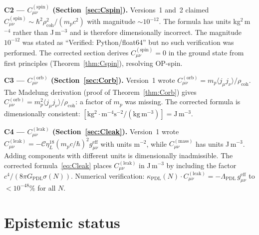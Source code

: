 \documentclass[12pt,a4paper]{article}
\newcommand{\hb}{\hbar}
\newcommand{\Cmass}{C^{(\mathrm{mass})}}
\newcommand{\Cspin}{C^{(\mathrm{spin})}}
\newcommand{\Corb}{C^{(\mathrm{orb})}}
\newcommand{\Cleak}{C^{(\mathrm{leak})}}
\newcommand{\rhocoh}{\rho_{\mathrm{coh}}}
\newcommand{\sig}{\sigma}
\newcommand{\kPDL}{\kappa_{\mathrm{PDL}}}
\newcommand{\GPDL}{G_{\mathrm{PDL}}}
\newcommand{\geff}{g_{\mu\nu}^{\mathrm{eff}}}
\newcommand{\etaL}{\eta_L}
\newcommand{\LambdaPDL}{\Lambda_{\mathrm{PDL}}}
\begin{document}
\textbf{C2 --- $\Cspin_{\mu\nu}$ (Section~\ref{sec:Cspin}).} Versions~1 and~2 claimed $\Cspin_{\mu\nu} \sim \hb^2\rhocoh^2/(m_p c^2)$ with magnitude $\sim 10^{-12}$. The formula has units kg$^2$\,m$^{-4}$ rather than J\,m$^{-3}$ and is therefore dimensionally incorrect. The magnitude $10^{-12}$ was stated as ``Verified: Python/float64'' but no such verification was performed. The corrected section derives $\Cspin_{\mu\nu} = 0$ in the ground state from first principles (Theorem~\ref{thm:Cspin}), resolving OP-spin.

\textbf{C3 --- $\Corb_{\mu\nu}$ (Section~\ref{sec:Corb}).} Version~1 wrote $\Corb_{\mu\nu} = m_p\langle j_\mu j_\nu\rangle/\rhocoh$. The Madelung derivation (proof of Theorem~\ref{thm:Corb}) gives $\Corb_{\mu\nu} = m_p^2\langle j_\mu j_\nu\rangle/\rhocoh$: a factor of $m_p$ was missing. The corrected formula is dimensionally consistent: $[\mathrm{kg^2\cdot m^{-4}s^{-2}/(kg\,m^{-3})}] = \mathrm{J\,m^{-3}}$.

\textbf{C4 --- $\Cleak_{\mu\nu}$ (Section~\ref{sec:Cleak}).} Version~1 wrote $\Cleak_{\mu\nu} = -\mathcal{C}\etaL^{18}(m_p c/\hb)^2\geff$ with units m$^{-2}$, while $\Cmass_{\mu\nu}$ has units J\,m$^{-3}$. Adding components with different units is dimensionally inadmissible. The corrected formula~\eqref{eq:Cleak} places $\Cleak_{\mu\nu}$ in J\,m$^{-3}$ by including the factor $c^4/(8\pi\GPDL\sig(N))$. Numerical verification: $\kPDL(N)\cdot\Cleak_{\mu\nu} = -\LambdaPDL\,\geff$ to $<10^{-48}\%$ for all $N$.

\section{Epistemic status}
\label{sec:epistemic}
\end{document}
